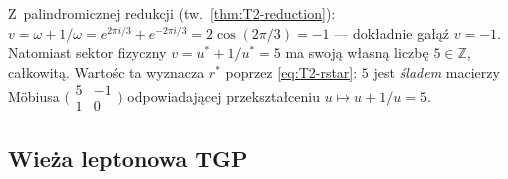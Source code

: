 \begin{remark}[Sektor $v=-1$ a~skok $r^*$]\label{rem:T2-v-minus1}
Z~palindromicznej redukcji (tw.~\ref{thm:T2-reduction}):
$v = \omega + 1/\omega = e^{2\pi i/3} + e^{-2\pi i/3}
= 2\cos(2\pi/3) = -1$ --- dok\l{}adnie ga\l{}\k{a}\'z $v=-1$.
Natomiast sektor fizyczny $v = u^*+1/u^* = 5$ ma swoj\k{a} w\l{}asn\k{a}
liczb\k{e} $5 \in \mathbb{Z}$, ca\l{}kowit\k{a}.
Warto\'sc ta wyznacza
$r^*$ poprzez \eqref{eq:T2-rstar}: $5$ jest \emph{\'sladem}
macierzy Möbiusa $\bigl(\begin{smallmatrix}5&-1\\1&0\end{smallmatrix}\bigr)$
odpowiadaj\k{a}cej przekszta\l{}ceniu $u \mapsto u+1/u = 5$.
\end{remark}


\subsection{Wie\.za leptonowa TGP}\label{app:T2-tower}

